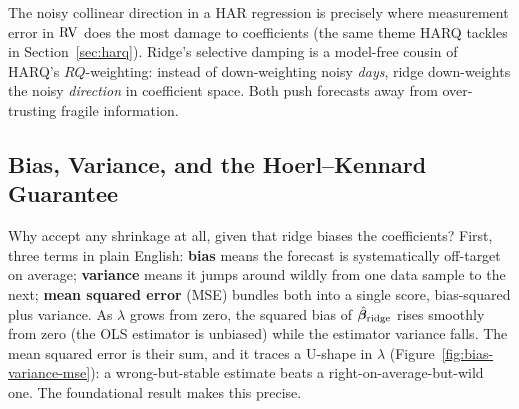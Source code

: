 \begin{projectconnection}
The noisy collinear direction in a HAR regression is precisely where measurement error in $\operatorname{RV}$ does the most damage to coefficients (the same theme HARQ tackles in Section~\ref{sec:harq}).
Ridge's selective damping is a model-free cousin of HARQ's $RQ$-weighting: instead of down-weighting noisy \emph{days}, ridge down-weights the noisy \emph{direction} in coefficient space.
Both push forecasts away from over-trusting fragile information.
\end{projectconnection}

\subsection{Bias, Variance, and the Hoerl--Kennard Guarantee}

Why accept any shrinkage at all, given that ridge biases the coefficients?
First, three terms in plain English: \textbf{bias} means the forecast is systematically off-target on average; \textbf{variance} means it jumps around wildly from one data sample to the next; \textbf{mean squared error} (MSE) bundles both into a single score, bias-squared plus variance.
As $\lambda$ grows from zero, the squared bias of $\hat{\bm{\beta}}_{\mathrm{ridge}}$ rises smoothly from zero (the OLS estimator is unbiased) while the estimator variance falls.
The mean squared error is their sum, and it traces a U-shape in $\lambda$ (Figure~\ref{fig:bias-variance-mse}): a wrong-but-stable estimate beats a right-on-average-but-wild one.
The foundational result makes this precise.

